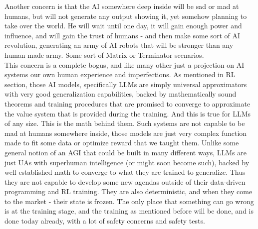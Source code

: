 \documentclass{article}
\begin{document}
Another concern is that the AI somewhere deep inside will be sad or mad at humans, but will not generate any output showing it, yet somehow planning to take over the world. He will wait until one day, it will gain enough power and influence, and will gain the trust of humans - and then make some sort of AI revolution, generating an army of AI robots that will be stronger than any human made army. Some sort of Matrix\cite{wachowski1999matrix} or Terminator\cite{cameron1984terminator} scenarios\cite{bostrom2014superintelligence}.\\

This concern is a complete bogus, and like many other just a projection on AI systems our own human experience and imperfections. As mentioned in RL section, those AI models, specifically LLMs are simply universal approximators with very good generalization capabilities, backed by mathematically sound theorems and training procedures that are promised to converge to approximate the value system that is provided during the training. And this is true for LLMs of any size. This is the math behind them. Such systems are not capable to be mad at humans somewhere inside, those models are just very complex function made to fit some data or optimize reward that we taught them. Unlike some general notion of an AGI that could be built in many different ways, LLMs are just UAs with superhuman intelligence (or might soon become such), backed by well established math to converge to what they are trained to generalize. Thus they are not capable to develop some new agendas outside of their data-driven programming and RL training. They are also deterministic, and when they come to the market - their state is frozen. The only place that something can go wrong is at the training stage, and the training as mentioned before will be done, and is done today already, with a lot of safety concerns and safety tests. \\
\end{document}
